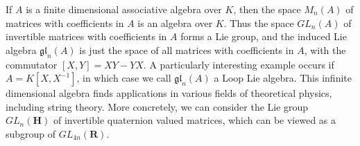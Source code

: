 \begin{example}
    If $A$ is a finite dimensional associative algebra over $K$, then the space $M_n(A)$ of matrices with coefficients in $A$ is an algebra over $K$. Thus the space $GL_n(A)$ of invertible matrices with coefficients in $A$ forms a Lie group, and the induced Lie algebra $\mathfrak{gl}_n(A)$ is just the space of all matrices with coefficients in $A$, with the commutator $[X,Y] = XY - YX$. A particularly interesting example occurs if $A = K[X,X^{-1}]$, in which case we call $\mathfrak{gl}_n(A)$ a Loop Lie algebra. This infinite dimensional algebra finds applications in various fields of theoretical physics, including string theory. More concretely, we can consider the Lie group $GL_n(\mathbf{H})$ of invertible quaternion valued matrices, which can be viewed as a subgroup of $GL_{4n}(\mathbf{R})$.
\end{example}

